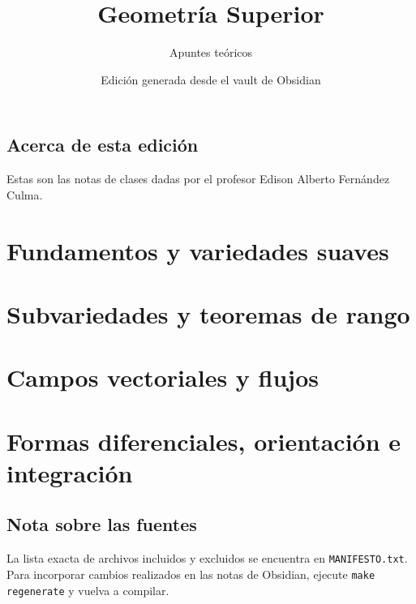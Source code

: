 \documentclass[11pt,a4paper,twoside,openright]{book}
\title{Geometría Superior}
\author{Apuntes teóricos}
\date{Edición generada desde el vault de Obsidian}
\begin{document}
\frontmatter
\maketitle
\thispagestyle{empty}

\cleardoublepage
\chapter*{Acerca de esta edición}
Estas son las notas de clases dadas por el profesor Edison Alberto Fernández
Culma.

\tableofcontents

\mainmatter
\part{Fundamentos y variedades suaves}








\part{Subvariedades y teoremas de rango}








\part{Campos vectoriales y flujos}






\part{Formas diferenciales, orientación e integración}







\backmatter
\cleardoublepage
\chapter*{Nota sobre las fuentes}
La lista exacta de archivos incluidos y excluidos se encuentra en
\texttt{MANIFESTO.txt}. Para incorporar cambios realizados en las notas de
Obsidian, ejecute \texttt{make regenerate} y vuelva a compilar.
\end{document}
